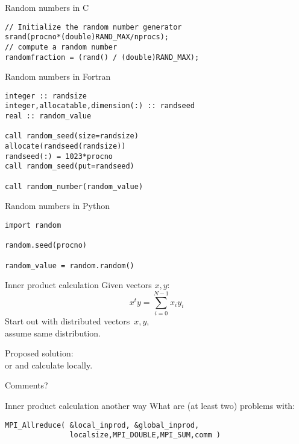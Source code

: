 \begin{exerciseframe}[randommax]
  
\end{exerciseframe}

\begin{numberedframe}{Random numbers in C}
\lstset{language=C}
\begin{lstlisting}
// Initialize the random number generator
srand(procno*(double)RAND_MAX/nprocs);
// compute a random number
randomfraction = (rand() / (double)RAND_MAX);
\end{lstlisting}
\end{numberedframe}

\begin{numberedframe}{Random numbers in Fortran}
\lstset{language=Fortran}
\begin{lstlisting}
integer :: randsize
integer,allocatable,dimension(:) :: randseed
real :: random_value

call random_seed(size=randsize)
allocate(randseed(randsize))
randseed(:) = 1023*procno
call random_seed(put=randseed)

call random_number(random_value)
\end{lstlisting}
\end{numberedframe}

\begin{numberedframe}{Random numbers in Python}
\lstset{language=Python}
\begin{lstlisting}
import random

random.seed(procno)

random_value = random.random()
\end{lstlisting}
\end{numberedframe}

\begin{numberedframe}{Inner product calculation}
  Given vectors $x,y$:
  \[ x^ty = \sum_{i=0}^{N-1} x_iy_i \]
  Start out with distributed vectors~$x,y$,\\
  assume same distribution.

  Proposed solution:\\
   or 
  and calculate locally.

  Comments?
\end{numberedframe}

\begin{numberedframe}{Inner product calculation another way}
  What are (at least two) problems with:
\begin{lstlisting}
MPI_Allreduce( &local_inprod, &global_inprod, 
               localsize,MPI_DOUBLE,MPI_SUM,comm )
\end{lstlisting}
\end{numberedframe}


